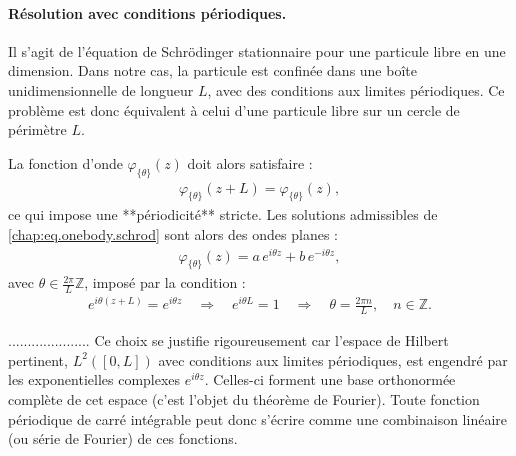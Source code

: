 



\paragraph{Résolution avec conditions périodiques.}

Il s'agit de l’équation de Schrödinger stationnaire pour une particule libre en une dimension. Dans notre cas, la particule est confinée dans une boîte unidimensionnelle de longueur $L$, avec des conditions aux limites périodiques. Ce problème est donc équivalent à celui d’une particule libre sur un cercle de périmètre $L$.

La fonction d’onde $\varphi_{\{\theta\}}(z)$ doit alors satisfaire :
\begin{eqnarray}
	\varphi_{\{\theta\}}(z+L) = \varphi_{\{\theta\}}(z),
\end{eqnarray}
ce qui impose une **périodicité** stricte. Les solutions admissibles de \eqref{chap:eq.onebody.schrod} sont alors des ondes planes :
\begin{eqnarray}
	\varphi_{\{\theta\}}(z) = a\,e^{i \theta z} + b\,e^{-i \theta z},
\end{eqnarray}\label{chap:eq.onebody.ansatz}
avec $\theta \in \frac{2\pi}{L} \mathbb{Z}$, imposé par la condition :
\begin{eqnarray}
	e^{i \theta(z+L)} = e^{i \theta z} \quad \Rightarrow \quad e^{i \theta L} = 1 \quad \Rightarrow \quad \theta = \frac{2\pi n}{L}, \quad n \in \mathbb{Z}.
\end{eqnarray}

.....................
Ce choix se justifie rigoureusement car l’espace de Hilbert pertinent, \( L^2([0,L]) \) avec conditions aux limites périodiques, est engendré par les exponentielles complexes \( e^{i \theta z} \). Celles-ci forment une base orthonormée complète de cet espace (c’est l’objet du théorème de Fourier). Toute fonction périodique de carré intégrable peut donc s’écrire comme une combinaison linéaire (ou série de Fourier) de ces fonctions.

